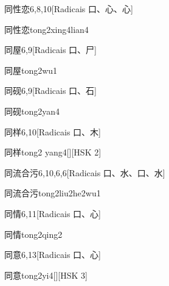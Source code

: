 \begin{entry}{同性恋}{6,8,10}[Radicais ⼝、⼼、⼼]
  \begin{phonetics}{同性恋}{tong2xing4lian4}
  \end{phonetics}
\end{entry}

\begin{entry}{同屋}{6,9}[Radicais ⼝、⼫]
  \begin{phonetics}{同屋}{tong2wu1}
  \end{phonetics}
\end{entry}

\begin{entry}{同砚}{6,9}[Radicais ⼝、⽯]
  \begin{phonetics}{同砚}{tong2yan4}
  \end{phonetics}
\end{entry}

\begin{entry}{同样}{6,10}[Radicais ⼝、⽊]
  \begin{phonetics}{同样}{tong2 yang4}[][HSK 2]
  \end{phonetics}
\end{entry}

\begin{entry}{同流合污}{6,10,6,6}[Radicais ⼝、⽔、⼝、⽔]
  \begin{phonetics}{同流合污}{tong2liu2he2wu1}
  \end{phonetics}
\end{entry}

\begin{entry}{同情}{6,11}[Radicais ⼝、⼼]
  \begin{phonetics}{同情}{tong2qing2}
  \end{phonetics}
\end{entry}

\begin{entry}{同意}{6,13}[Radicais ⼝、⼼]
  \begin{phonetics}{同意}{tong2yi4}[][HSK 3]
  \end{phonetics}
\end{entry}

